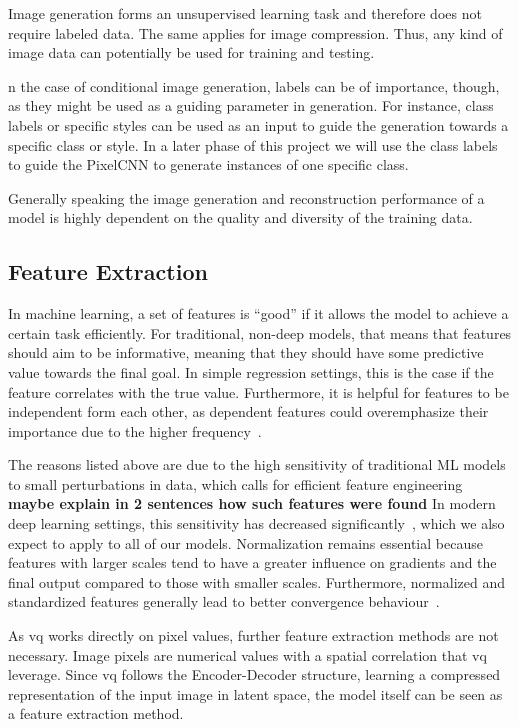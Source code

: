Image generation forms an unsupervised learning task and therefore does not require labeled data.
The same applies for image compression.
Thus, any kind of image data can potentially be used for training and testing.

n the case of conditional image generation, labels can be of importance, though, as they might be used as a guiding
parameter in generation.
For instance, class labels or specific styles  can be used as an input to guide the generation towards a specific class or style.
In a later phase of this project we will use the class labels to guide the PixelCNN to generate instances of one specific class.

Generally speaking the image generation and reconstruction performance of a model is highly dependent on the quality
and diversity of the training data.

\subsection{Feature Extraction}\label{subsec:feature-extraction}
In machine learning, a set of features is ``good'' if it allows the model to achieve a certain task
efficiently.
For traditional, non-deep models, that means that features should aim to be informative, meaning that
they should have some predictive value towards the final goal.
In simple regression settings, this is the case if the feature correlates with the true value.
Furthermore, it is helpful for features to be independent form each other, as dependent features could overemphasize
their importance due to the higher frequency~\cite{featengineer}.

The reasons listed above are due to the high sensitivity of traditional ML models to small perturbations in data,
which calls for efficient feature engineering~\cite{lecun2015deep}
\textbf{maybe explain in 2 sentences how such features were found}
In modern deep learning settings, this sensitivity has decreased significantly~\cite{lecun2015deep}, which we also
expect to apply to all of our models.
Normalization remains essential because features with larger scales tend to have a greater influence on gradients and
the final output compared to those with smaller scales.
Furthermore, normalized and standardized features generally lead to better convergence behaviour~\cite{mueller}.

As \ac{vq} works directly on pixel values, further feature extraction methods are not necessary.
Image pixels are numerical values with a spatial correlation that \ac{vq} leverage.
Since \ac{vq} follows the Encoder-Decoder structure, learning a compressed representation of the input image in latent
space, the model itself can be seen as a feature extraction method.

